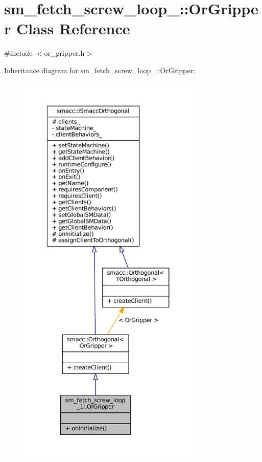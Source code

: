 \hypertarget{classsm__fetch__screw__loop__1_1_1OrGripper}{}\section{sm\+\_\+fetch\+\_\+screw\+\_\+loop\+\_\+:\+:Or\+Gripper Class Reference}
\label{classsm__fetch__screw__loop__1_1_1OrGripper}


{\ttfamily \#include $<$or\+\_\+gripper.\+h$>$}



Inheritance diagram for sm\+\_\+fetch\+\_\+screw\+\_\+loop\+\_\+:\+:Or\+Gripper\+:
\nopagebreak
\begin{figure}[H]
\begin{center}
\leavevmode
\includegraphics[height=550pt]{classsm__fetch__screw__loop__1_1_1OrGripper__inherit__graph}
\end{center}
\end{figure}


